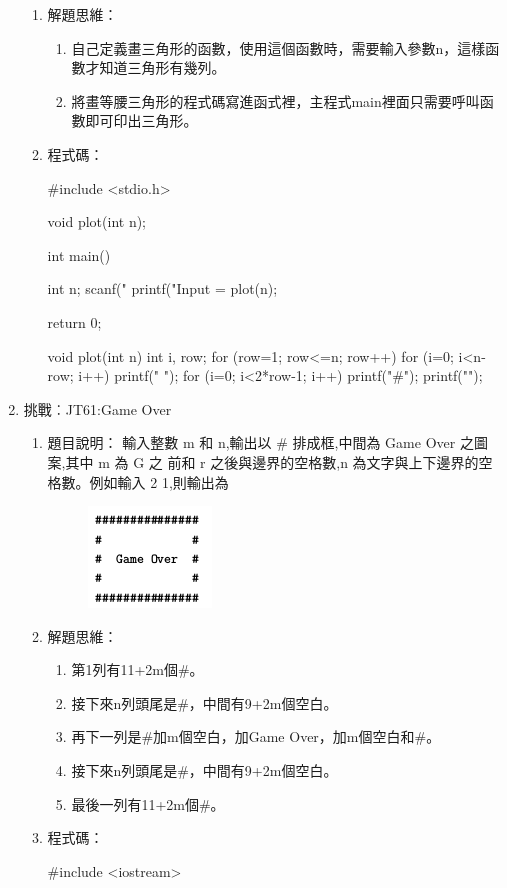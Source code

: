 \begin{enumerate}
\begin{enumerate}
			\item 解題思維：
			\begin{enumerate}
				\item 自己定義畫三角形的函數，使用這個函數時，需要輸入參數n，這樣函數才知道三角形有幾列。
				\item 將畫等腰三角形的程式碼寫進函式裡，主程式main裡面只需要呼叫函數即可印出三角形。
			\end{enumerate}
			
			\item 程式碼：
			\begin{cppcode}
				#include <stdio.h>
				
				void plot(int n);
				
				int main()
				{
					int n;
					scanf("%
					printf("Input = %
					plot(n);
					
					return 0;
				}
				
				void plot(int n)
				{
					int i, row;
					for (row=1; row<=n; row++) {
						for (i=0; i<n-row; i++) printf(" ");
						for (i=0; i<2*row-1; i++) printf("#");
						printf("\n");
					}
				}
				
				
			\end{cppcode}
		\end{enumerate}
		
	
	
	\item 挑戰︰JT61:Game Over
		\begin{enumerate}
			\item 題目說明：
			\subitem 輸入整數 m 和 n,輸出以 \# 排成框,中間為 Game Over 之圖案,其中 m 為 G 之
			前和 r 之後與邊界的空格數,n 為文字與上下邊界的空格數。例如輸入 2 1,則輸出為
			\begin{figure}[h]
			\centering
			\includegraphics{fig/game_over_fig}
			\end{figure}
			\item 解題思維：
			\begin{enumerate}
				\item 第1列有11+2m個\#。
				\item 接下來n列頭尾是\#，中間有9+2m個空白。
				\item 再下一列是\#加m個空白，加Game Over，加m個空白和\#。
				\item 接下來n列頭尾是\#，中間有9+2m個空白。
				\item 最後一列有11+2m個\#。
			\end{enumerate}
			\item 程式碼：
		\begin{cppcode}
			#include <iostream>
			

\end{cppcode}
\end{enumerate}
\end{enumerate}

